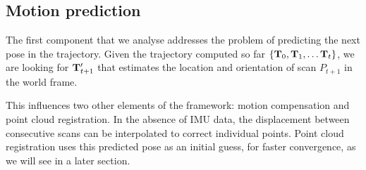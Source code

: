 
\subsection{Motion prediction}
\label{subsec:motion-prediction}


The first component that we analyse addresses the problem of predicting the next pose in the trajectory. Given the trajectory computed so far $\left\{\mathbf{T}_0, \mathbf{T}_1, \dots \mathbf{T}_t \right\}$, we are looking for $\mathbf{T}_{t+1}'$ that estimates the location and orientation of scan $P_{t+1}$ in the world frame.

This influences two other elements of the framework: motion compensation and point cloud registration. In the absence of IMU data, the displacement between consecutive scans can be interpolated to correct individual points. Point cloud registration uses this predicted pose as an initial guess, for faster convergence, as we will see in a later section.

